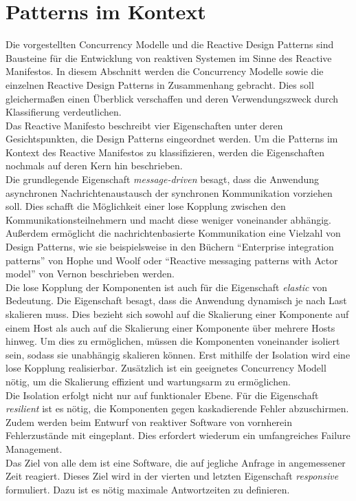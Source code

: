 \section{Patterns im Kontext}

Die vorgestellten Concurrency Modelle und die Reactive Design Patterns sind Bausteine für die Entwicklung von reaktiven Systemen im Sinne des Reactive Manifestos. In diesem Abschnitt werden die Concurrency Modelle sowie die einzelnen Reactive Design Patterns in Zusammenhang gebracht. Dies soll gleichermaßen einen Überblick verschaffen und deren Verwendungszweck durch Klassifierung verdeutlichen.\\
Das Reactive Manifesto beschreibt vier Eigenschaften unter deren Gesichtspunkten, die Design Patterns eingeordnet werden. Um die Patterns im Kontext des Reactive Manifestos zu klassifizieren, werden die Eigenschaften nochmals auf deren Kern hin beschrieben.\\

Die grundlegende Eigenschaft \textit{message-driven} besagt, dass die Anwendung asynchronen Nachrichtenaustausch der synchronen Kommunikation vorziehen soll. Dies schafft die Möglichkeit einer lose Kopplung zwischen den Kommunikationsteilnehmern und macht diese weniger voneinander abhängig. Außerdem ermöglicht die nachrichtenbasierte Kommunikation eine Vielzahl von Design Patterns, wie sie beispielsweise in den Büchern \enquote{Enterprise integration patterns} von Hophe und Woolf oder \enquote{Reactive messaging patterns with Actor model} von Vernon beschrieben werden.\\
Die lose Kopplung der Komponenten ist auch für die Eigenschaft \textit{elastic} von Bedeutung. Die Eigenschaft besagt, dass die Anwendung dynamisch je nach Last skalieren muss. Dies bezieht sich sowohl auf die Skalierung einer Komponente auf einem Host als auch auf die Skalierung einer Komponente über mehrere Hosts hinweg. Um dies zu ermöglichen, müssen die Komponenten voneinander isoliert sein, sodass sie unabhängig skalieren können. Erst mithilfe der Isolation wird eine lose Kopplung realisierbar. Zusätzlich ist ein geeignetes Concurrency Modell nötig, um die Skalierung effizient und wartungsarm zu ermöglichen.\\
Die Isolation erfolgt nicht nur auf funktionaler Ebene. Für die Eigenschaft \textit{resilient} ist es nötig, die Komponenten gegen kaskadierende Fehler abzuschirmen. Zudem werden beim Entwurf von reaktiver Software von vornherein Fehlerzustände mit eingeplant. Dies erfordert wiederum ein umfangreiches Failure Management.\\
Das Ziel von alle dem ist eine Software, die auf jegliche Anfrage in angemessener Zeit reagiert. Dieses Ziel wird in der vierten und letzten Eigenschaft \textit{responsive} formuliert. Dazu ist es nötig maximale Antwortzeiten zu definieren.\\

